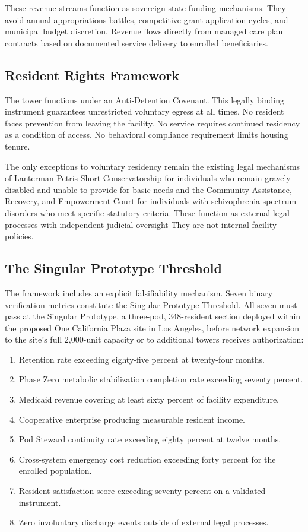 \documentclass[12pt, letterpaper]{article}
\begin{document}
These revenue streams function as sovereign state funding mechanisms. They avoid annual appropriations battles, competitive grant application cycles, and municipal budget discretion. Revenue flows directly from managed care plan contracts based on documented service delivery to enrolled beneficiaries.

\subsection{Resident Rights Framework}

The tower functions under an Anti-Detention Covenant. This legally binding instrument guarantees unrestricted voluntary egress at all times. No resident faces prevention from leaving the facility. No service requires continued residency as a condition of access. No behavioral compliance requirement limits housing tenure.

The only exceptions to voluntary residency remain the existing legal mechanisms of Lanterman-Petris-Short Conservatorship for individuals who remain gravely disabled and unable to provide for basic needs and the Community Assistance, Recovery, and Empowerment Court for individuals with schizophrenia spectrum disorders who meet specific statutory criteria. These function as external legal processes with independent judicial oversight They are not internal facility policies.

\subsection{The Singular Prototype Threshold}

The framework includes an explicit falsifiability mechanism. Seven binary verification metrics constitute the Singular Prototype Threshold. All seven must pass at the Singular Prototype, a three-pod, 348-resident section deployed within the proposed One California Plaza site in Los Angeles, before network expansion to the site's full 2,000-unit capacity or to additional towers receives authorization:

\begin{enumerate}
    \item Retention rate exceeding eighty-five percent at twenty-four months.
    \item Phase Zero metabolic stabilization completion rate exceeding seventy percent.
    \item Medicaid revenue covering at least sixty percent of facility expenditure.
    \item Cooperative enterprise producing measurable resident income.
    \item Pod Steward continuity rate exceeding eighty percent at twelve months.
    \item Cross-system emergency cost reduction exceeding forty percent for the enrolled population.
    \item Resident satisfaction score exceeding seventy percent on a validated instrument.
    \item Zero involuntary discharge events outside of external legal processes.
\end{enumerate}
\end{document}
